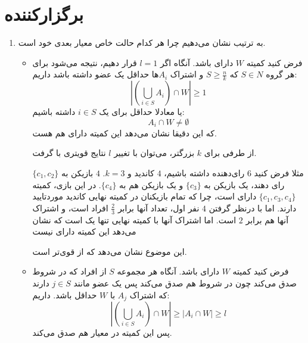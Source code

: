 \documentclass[12pt]{article}
\begin{document}
\section{برگزار‌کننده}
\begin{enumerate}
    \item {
        به ترتیب نشان می‌دهیم چرا هر کدام حالت خاص معیار بعدی خود است.

        \begin{itemize}
            \item {
                فرض کنید کمیته
                $W$
                دارای
                باشد. آنگاه اگر 
                $l = 1$
                قرار دهیم، نتیجه می‌شود برای هر گروه
                $S \in N$ 
                که
                $S \ge \frac{n}{k}$
                و 
                اشتراک $A_i$ها
                حداقل یک عضو داشته باشد داریم:
                \[
                \left| (\bigcup_{i\in S} A_i) \cap W\right| \ge 1
                \]
                یا معادلا حداقل برای یک 
                $i \in S$
                داشته باشیم:
                \[
                A_i \cap W \neq \emptyset
                \]
                که این دقیقا نشان می‌دهد این کمیته 
                دارای 
                هم هست.

                از طرفی برای $k$
                بزرگتر، می‌توان با تغییر $l$
                نتایج قویتری با 
                گرفت. 

                مثلا فرض کنید $6$
                رای‌دهنده داشته باشیم، $4$
                کاندید و $k = 3$.
                $4$
                بازیکن به $\{c_1, c_2\}$
                رای دهند، یک بازیکن به $\{c_3\}$
                و یک بازیکن هم به $\{c_4\}$.
                در این بازی، کمیته 
                $\{c_1, c_3, c_4\}$
                دارای 
                است، چرا که
                تمام بازیکنان در کمیته نهایی کاندید موردتایید دارند.
                اما با درنظر گرفتن $4$ 
                نفر اول، تعداد آنها برابر 
                $\frac{2}{3}$
                افراد است، و اشتراک آنها هم برابر $2$ 
                است. اما اشتراک آنها با کمیته نهایی تنها یک است 
                که نشان می‌دهد این کمیته دارای
                نیست

                این موضوع نشان می‌دهد که 
                از
                قوی‌تر است.
            }
            \item {
                فرض کنید کمیته $W$
                دارای 
                باشد. آنگاه هر مجموعه 
                $S$
                از افراد که در شروط 
                صدق می‌کند چون در شروط 
                هم صدق می‌کند پس یک عضو مانند 
                $j \in S$ 
                دارند که اشتراک
                $A_j$
                با $W$
                حداقل 
                باشد. داریم:
                \[
                \left| (\bigcup_{i\in S} A_i) \cap W\right| \ge
                 \left| A_i \cap W \right| \ge l
                \]
                پس این کمیته در معیار
                هم صدق می‌کند.

}
\end{itemize}}
\end{enumerate}
\end{document}
